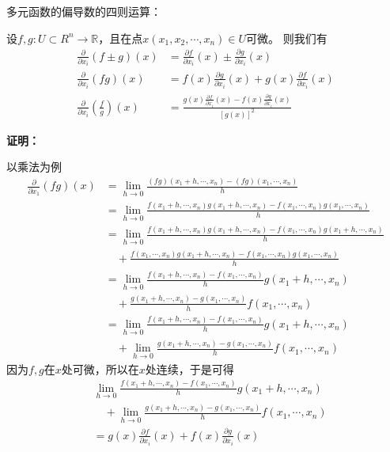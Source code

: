 \documentclass{article}
\begin{document}
\begin{zremark}
  多元函数的偏导数的四则运算：

  设$f, g : U \subset R^n \to \mathbb{R}$，且在点$x(x_1, x_2, \cdots, x_n) \in U$可微。
  则我们有
  \begin{align*}
    \frac{\partial}{\partial x_i} (f \pm g) (x)                & = \frac{\partial f}{\partial x_i}(x) \pm \frac{\partial g}{\partial x_i}(x)                        \\
    \frac{\partial}{\partial x_i} (f g) (x)                    & = f(x)\frac{\partial g}{\partial x_i}(x) + g(x)\frac{\partial f}{\partial x_i}(x)                  \\
    \frac{\partial}{\partial x_i} \left(\frac{f}{g}\right) (x) & = \frac{g(x)\frac{\partial f}{\partial x_i}(x) - f(x)\frac{\partial g}{\partial x_i}(x)}{[g(x)]^2}
  \end{align*}
\end{zremark}
\textbf{证明：}

以乘法为例
\begin{align*}
  \frac{\partial}{\partial x_1} (f g) (x)
   & = \lim\limits_{h \to 0} \frac{(f g) (x_1 + h, \cdots, x_n) - (f g) (x_1, \cdots, x_n)}{h}                                     \\
   & = \lim\limits_{h \to 0} \frac{f(x_1 + h, \cdots, x_n)g(x_1 + h, \cdots, x_n) - f (x_1, \cdots, x_n) g (x_1, \cdots, x_n)}{h}  \\
   & = \lim\limits_{h \to 0} \frac{f(x_1 + h, \cdots, x_n)g(x_1 + h, \cdots, x_n) - f(x_1, \cdots, x_n)g(x_1 + h, \cdots, x_n)}{h} \\
   & \quad + \frac{f(x_1, \cdots, x_n)g(x_1 + h, \cdots, x_n) - f (x_1, \cdots, x_n) g (x_1, \cdots, x_n)}{h}                      \\
   & = \lim\limits_{h \to 0} \frac{f(x_1 + h, \cdots, x_n) - f(x_1, \cdots, x_n)}{h} g(x_1 + h, \cdots, x_n)                       \\
   & \quad + \frac{g(x_1 + h, \cdots, x_n) - g (x_1, \cdots, x_n)}{h} f (x_1, \cdots, x_n)                                         \\
   & = \lim\limits_{h \to 0} \frac{f(x_1 + h, \cdots, x_n) - f(x_1, \cdots, x_n)}{h} g(x_1 + h, \cdots, x_n)                       \\
   & \quad + \lim\limits_{h \to 0} \frac{g(x_1 + h, \cdots, x_n) - g (x_1, \cdots, x_n)}{h} f (x_1, \cdots, x_n)
\end{align*}
因为$f,g$在$x$处可微，所以在$x$处连续，于是可得
\begin{align*}
   & \lim\limits_{h \to 0} \frac{f(x_1 + h, \cdots, x_n) - f(x_1, \cdots, x_n)}{h} g(x_1 + h, \cdots, x_n)       \\
   & \quad + \lim\limits_{h \to 0} \frac{g(x_1 + h, \cdots, x_n) - g (x_1, \cdots, x_n)}{h} f (x_1, \cdots, x_n) \\
   & = g(x)\frac{\partial f}{\partial x_i}(x) + f(x)\frac{\partial g}{\partial x_i}(x)
\end{align*}
\end{document}
